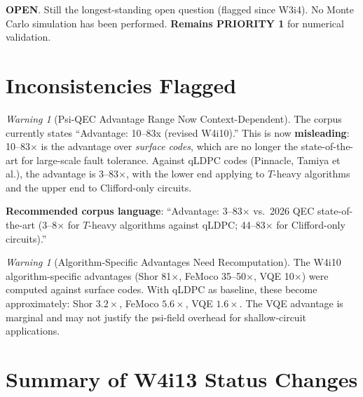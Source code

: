 \documentclass[11pt]{article}
\theoremstyle{definition}
\theoremstyle{remark}
\newtheorem{warning}[theorem]{Warning}
\begin{document}
\textbf{OPEN}. Still the longest-standing open question (flagged since
W3i4).  No Monte Carlo simulation has been performed.
\textbf{Remains PRIORITY 1} for numerical validation.

\section{Inconsistencies Flagged}
\label{sec:inconsistencies}

\begin{warning}[Psi-QEC Advantage Range Now Context-Dependent]
\label{warn:advantage-range}
The corpus currently states ``Advantage: 10--83x (revised W4i10).''
This is now \textbf{misleading}: 10--83$\times$ is the advantage over
\emph{surface codes}, which are no longer the state-of-the-art for
large-scale fault tolerance.  Against qLDPC codes (Pinnacle, Tamiya et al.),
the advantage is 3--83$\times$, with the lower end applying to $T$-heavy
algorithms and the upper end to Clifford-only circuits.

\textbf{Recommended corpus language}: ``Advantage: 3--83$\times$ vs.\
2026 QEC state-of-the-art (3--8$\times$ for $T$-heavy algorithms
against qLDPC; 44--83$\times$ for Clifford-only circuits).''
\end{warning}

\begin{warning}[Algorithm-Specific Advantages Need Recomputation]
\label{warn:algorithm-specific}
The W4i10 algorithm-specific advantages (Shor 81$\times$, FeMoco
35--50$\times$, VQE 10$\times$) were computed against surface codes.
With qLDPC as baseline, these become approximately: Shor $3.2\times$,
FeMoco $5.6\times$, VQE $1.6\times$.  The VQE advantage is marginal
and may not justify the psi-field overhead for shallow-circuit applications.
\end{warning}

\section{Summary of W4i13 Status Changes}
\label{sec:status-changes}
\end{document}
